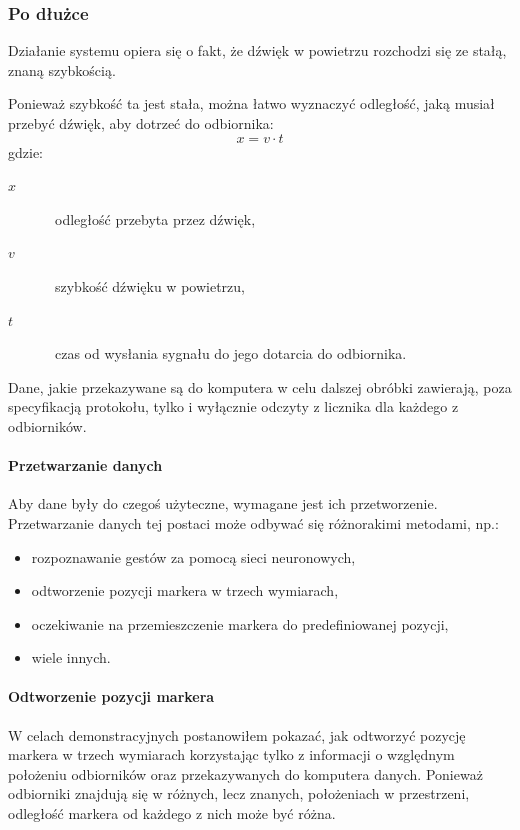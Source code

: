 \subsubsection{Po dłużce}
Działanie systemu opiera się o fakt, że dźwięk w powietrzu rozchodzi się ze stałą, znaną szybkością.

Ponieważ szybkość ta jest stała, można łatwo wyznaczyć odległość, jaką musiał przebyć dźwięk, aby dotrzeć do odbiornika:
\begin{equation}
 x = v \cdot t
 \label{eq:sound_distance}
\end{equation}
gdzie:
\begin{description}
 \item[$x$] \ppauza~odległość przebyta przez dźwięk,
 \item[$v$] \ppauza~szybkość dźwięku w powietrzu,
 \item[$t$] \ppauza~czas od wysłania sygnału do jego dotarcia do odbiornika. 
\end{description}

Dane, jakie przekazywane są do komputera w celu dalszej obróbki zawierają, poza specyfikacją protokołu, tylko i wyłącznie odczyty z licznika dla każdego z odbiorników.

\paragraph{Przetwarzanie danych}
Aby dane były do czegoś użyteczne, wymagane jest ich przetworzenie. Przetwarzanie danych tej postaci może odbywać się różnorakimi metodami, np.:
\begin{itemize}
 \item rozpoznawanie gestów za pomocą sieci neuronowych,
 \item odtworzenie pozycji markera w trzech wymiarach,
 \item oczekiwanie na przemieszczenie markera do predefiniowanej pozycji,
 \item wiele innych.
\end{itemize}

\paragraph{Odtworzenie pozycji markera}
W celach demonstracyjnych postanowiłem pokazać, jak odtworzyć pozycję markera w trzech wymiarach korzystając tylko z informacji o względnym położeniu odbiorników oraz przekazywanych do komputera danych.
\newline
\newline
Ponieważ odbiorniki znajdują się w różnych, lecz znanych, położeniach w przestrzeni, odległość markera od każdego z nich może być różna.

